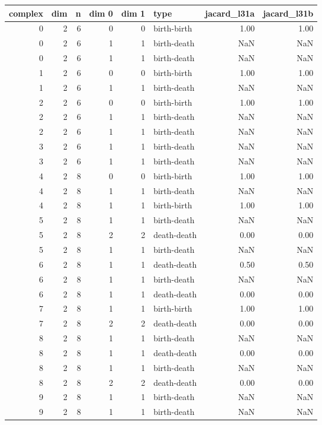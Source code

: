 \documentclass{article}
\begin{document}
\begin{center}
\begin{tabular}{rrrrrlrr}
\toprule
complex & dim & n & dim 0 & dim 1 & type & jacard\_l31a & jacard\_l31b \\
\midrule
0 & 2 & 6 & 0 & 0 & birth-birth & 1.00 & 1.00 \\
0 & 2 & 6 & 1 & 1 & birth-death & NaN & NaN \\
0 & 2 & 6 & 1 & 1 & birth-death & NaN & NaN \\
1 & 2 & 6 & 0 & 0 & birth-birth & 1.00 & 1.00 \\
1 & 2 & 6 & 1 & 1 & birth-death & NaN & NaN \\
2 & 2 & 6 & 0 & 0 & birth-birth & 1.00 & 1.00 \\
2 & 2 & 6 & 1 & 1 & birth-death & NaN & NaN \\
2 & 2 & 6 & 1 & 1 & birth-death & NaN & NaN \\
3 & 2 & 6 & 1 & 1 & birth-death & NaN & NaN \\
3 & 2 & 6 & 1 & 1 & birth-death & NaN & NaN \\
4 & 2 & 8 & 0 & 0 & birth-birth & 1.00 & 1.00 \\
4 & 2 & 8 & 1 & 1 & birth-death & NaN & NaN \\
4 & 2 & 8 & 1 & 1 & birth-birth & 1.00 & 1.00 \\
5 & 2 & 8 & 1 & 1 & birth-death & NaN & NaN \\
5 & 2 & 8 & 2 & 2 & death-death & 0.00 & 0.00 \\
5 & 2 & 8 & 1 & 1 & birth-death & NaN & NaN \\
6 & 2 & 8 & 1 & 1 & death-death & 0.50 & 0.50 \\
6 & 2 & 8 & 1 & 1 & birth-death & NaN & NaN \\
6 & 2 & 8 & 1 & 1 & death-death & 0.00 & 0.00 \\
7 & 2 & 8 & 1 & 1 & birth-birth & 1.00 & 1.00 \\
7 & 2 & 8 & 2 & 2 & death-death & 0.00 & 0.00 \\
8 & 2 & 8 & 1 & 1 & birth-death & NaN & NaN \\
8 & 2 & 8 & 1 & 1 & death-death & 0.00 & 0.00 \\
8 & 2 & 8 & 1 & 1 & birth-death & NaN & NaN \\
8 & 2 & 8 & 2 & 2 & death-death & 0.00 & 0.00 \\
9 & 2 & 8 & 1 & 1 & birth-death & NaN & NaN \\
9 & 2 & 8 & 1 & 1 & birth-death & NaN & NaN \\

\end{tabular}
\end{center}
\end{document}
